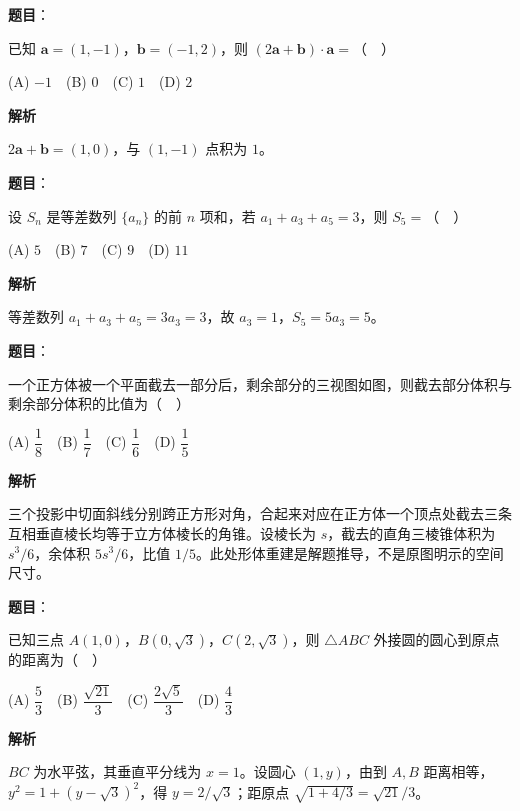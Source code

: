 \begin{answer}

\textbf{题目}：

已知 $\boldsymbol a=(1,-1)$，$\boldsymbol b=(-1,2)$，则 $(2\boldsymbol a+\boldsymbol b)\cdot\boldsymbol a=$（　）

(A) $-1$　(B) $0$　(C) $1$　(D) $2$

\textbf{解析}

$2\boldsymbol a+\boldsymbol b=(1,0)$，与 $(1,-1)$ 点积为 $1$。


\end{answer}
\begin{answer}

\textbf{题目}：

设 $S_n$ 是等差数列 $\{a_n\}$ 的前 $n$ 项和，若 $a_1+a_3+a_5=3$，则 $S_5=$（　）

(A) $5$　(B) $7$　(C) $9$　(D) $11$

\textbf{解析}

等差数列 $a_1+a_3+a_5=3a_3=3$，故 $a_3=1$，$S_5=5a_3=5$。


\end{answer}
\begin{answer}

\textbf{题目}：

一个正方体被一个平面截去一部分后，剩余部分的三视图如图，则截去部分体积与剩余部分体积的比值为（　）
\nopagebreak[4]
\begin{center}\end{center}
\nopagebreak[4]
(A) $\dfrac18$　(B) $\dfrac17$　(C) $\dfrac16$　(D) $\dfrac15$

\textbf{解析}

三个投影中切面斜线分别跨正方形对角，合起来对应在正方体一个顶点处截去三条互相垂直棱长均等于立方体棱长的角锥。设棱长为 $s$，截去的直角三棱锥体积为 $s^3/6$，余体积 $5s^3/6$，比值 $1/5$。此处形体重建是解题推导，不是原图明示的空间尺寸。


\end{answer}
\begin{answer}

\textbf{题目}：

已知三点 $A(1,0)$，$B(0,\sqrt3)$，$C(2,\sqrt3)$，则 $\triangle ABC$ 外接圆的圆心到原点的距离为（　）

(A) $\dfrac53$　(B) $\dfrac{\sqrt{21}}3$　(C) $\dfrac{2\sqrt5}3$　(D) $\dfrac43$

\textbf{解析}

$BC$ 为水平弦，其垂直平分线为 $x=1$。设圆心 $(1,y)$，由到 $A,B$ 距离相等，$y^2=1+(y-\sqrt3)^2$，得 $y=2/\sqrt3$；距原点 $\sqrt{1+4/3}=\sqrt{21}/3$。


\end{answer}
